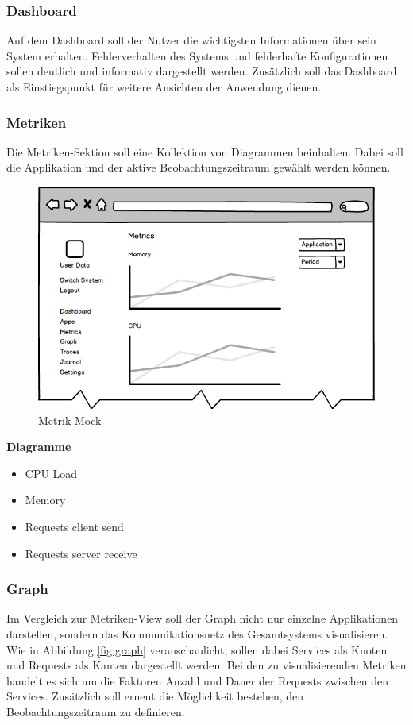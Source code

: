 \subsubsection{Dashboard}

Auf dem Dashboard soll der Nutzer die wichtigsten Informationen über sein System erhalten.
Fehlerverhalten des Systems und fehlerhafte Konfigurationen sollen deutlich und informativ dargestellt werden.
Zusätzlich soll das Dashboard als Einstiegspunkt für weitere Ansichten der Anwendung dienen.

\subsubsection{Metriken}

Die Metriken-Sektion soll eine Kollektion von Diagrammen beinhalten.
Dabei soll die Applikation und der aktive Beobachtungszeitraum gewählt werden können.

\begin{figure}[h]
 \centering
 \includegraphics[width=0.6\linewidth]{kapitel1/mocks/metrics.png}
 \caption{Metrik Mock}
  \label{fig:metrics}
\end{figure}

\textbf{Diagramme}

\begin{itemize}
\item CPU Load
\item Memory
\item Requests client send
\item Requests server receive
\end{itemize}


\subsubsection{Graph}

Im Vergleich zur Metriken-View soll der Graph nicht nur einzelne Applikationen darstellen,
sondern das Kommunikationsnetz des Gesamtsystems visualisieren.
Wie in Abbildung \ref{fig:graph} veranschaulicht, sollen dabei Services als Knoten und Requests als Kanten dargestellt werden.
Bei den zu visualisierenden Metriken handelt es sich um die Faktoren Anzahl und Dauer der Requests zwischen den Services.
Zusätzlich soll erneut die Möglichkeit bestehen, den Beobachtungszeitraum zu definieren.

